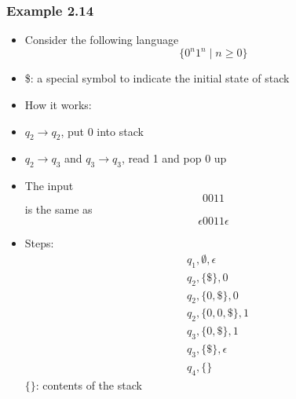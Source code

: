 \begin{frame}[allowframebreaks] \frametitle{Example 2.14}
  \begin{itemize}
  \item Consider the following language
    \begin{equation*}
    \{0^n 1^n\mid n \geq 0\}
  \end{equation*}

\begin{center}
\end{center}
\item \$: a special symbol to indicate the initial state of stack

  
\item How it works:
  \item [] $q_2 \rightarrow q_2$, put 0 into stack

  \item [] $q_2 \rightarrow q_3$ and $q_3 \rightarrow q_3$, read 1 and  pop 0 up
  \item The input
  \begin{equation*}
    0011
  \end{equation*}
is the same as
  \begin{equation*}
    \epsilon 0011 \epsilon
  \end{equation*}
\item Steps:
  \begin{equation*}
    \begin{split}
& q_1, \emptyset, \epsilon\\
& q_2, \{\$\}, 0 \\
& q_2, \{0,\$\}, 0\\
& q_2, \{0,0,\$\}, 1\\
& q_3, \{0,\$\}, 1\\
& q_3, \{\$\}, \epsilon\\
& q_4, \{\}
\end{split}
\end{equation*}
$\{\}$: contents of the stack


\end{itemize}
\end{frame}
